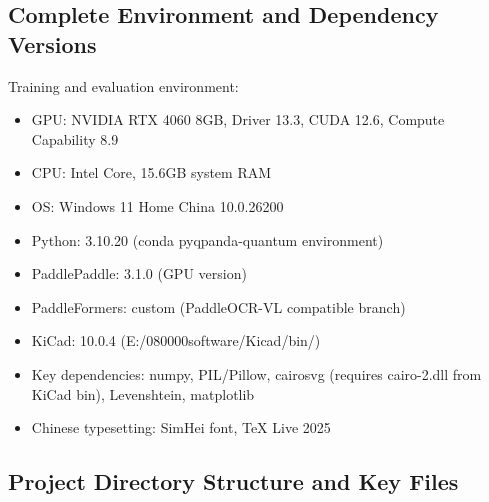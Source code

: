 \subsection{Complete Environment and Dependency Versions}

Training and evaluation environment:

\begin{itemize}[nosep]
    \item GPU: NVIDIA RTX 4060 8GB, Driver 13.3, CUDA 12.6, Compute Capability 8.9
    \item CPU: Intel Core, 15.6GB system RAM
    \item OS: Windows 11 Home China 10.0.26200
    \item Python: 3.10.20 (conda pyqpanda-quantum environment)
    \item PaddlePaddle: 3.1.0 (GPU version)
    \item PaddleFormers: custom (PaddleOCR-VL compatible branch)
    \item KiCad: 10.0.4 (E:/080000software/Kicad/bin/)
    \item Key dependencies: numpy, PIL/Pillow, cairosvg (requires cairo-2.dll from KiCad bin), Levenshtein, matplotlib
    \item Chinese typesetting: SimHei font, TeX Live 2025
\end{itemize}

\subsection{Project Directory Structure and Key Files}

